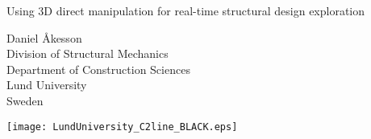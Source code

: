 \documentclass[twoside,openright,11pt]{book}
\begin{document}


\frontmatter

\begin{titlepage}
  \center
  \null
  \vspace{6cm}
  
  {\Huge Using 3D direct manipulation for real-time structural design exploration}

  \vspace{2cm}
  
  \Large{Daniel Åkesson \\ Division of Structural Mechanics \\ Department of Construction Sciences \\ Lund University \\ Sweden}
  \vspace{1cm}
  
  \texttt{[image: LundUniversity\_C2line\_BLACK.eps]}
\end{titlepage} 


\pagestyle{plain}

 
\newpage

 
\clearpage %

\cleardoublepage

\cleardoublepage %


\cleardoublepage %


\cleardoublepage %

\tableofcontents

 
\end{document}
